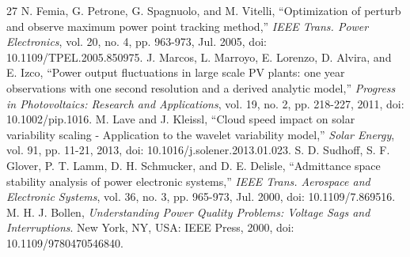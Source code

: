 \documentclass[journal]{IEEEtran}
\begin{document}
\begin{thebibliography}{27}
 N. Femia, G. Petrone, G. Spagnuolo, and M. Vitelli, ``Optimization of perturb and observe maximum power point tracking method,'' \emph{IEEE Trans. Power Electronics}, vol. 20, no. 4, pp. 963-973, Jul. 2005, doi: 10.1109/TPEL.2005.850975.
 J. Marcos, L. Marroyo, E. Lorenzo, D. Alvira, and E. Izco, ``Power output fluctuations in large scale PV plants: one year observations with one second resolution and a derived analytic model,'' \emph{Progress in Photovoltaics: Research and Applications}, vol. 19, no. 2, pp. 218-227, 2011, doi: 10.1002/pip.1016.
 M. Lave and J. Kleissl, ``Cloud speed impact on solar variability scaling - Application to the wavelet variability model,'' \emph{Solar Energy}, vol. 91, pp. 11-21, 2013, doi: 10.1016/j.solener.2013.01.023.
 S. D. Sudhoff, S. F. Glover, P. T. Lamm, D. H. Schmucker, and D. E. Delisle, ``Admittance space stability analysis of power electronic systems,'' \emph{IEEE Trans. Aerospace and Electronic Systems}, vol. 36, no. 3, pp. 965-973, Jul. 2000, doi: 10.1109/7.869516.
 M. H. J. Bollen, \emph{Understanding Power Quality Problems: Voltage Sags and Interruptions}. New York, NY, USA: IEEE Press, 2000, doi: 10.1109/9780470546840.
\end{thebibliography}
\end{document}
